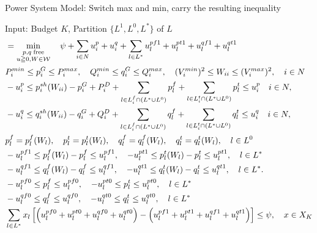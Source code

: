 \documentclass[xcolor=dvipsnames]{beamer}
\newcommand{\p}[1]{p^{#1}}
\newcommand{\q}[1]{q^{#1}}
\newcommand{\ii}{i}
\newcommand{\llll}{l}
\newcommand{\from}{f}
\newcommand{\tto}{t}
\newcommand{\WW}{W}
\newcommand{\WSet}{\mathcal{W}}
\newcommand{\Lines}{L}
\begin{document}
\begin{frame}{Power System Model: Switch max and min, carry the resulting inequality}
\begin{footnotesize}
Input: Budget $K$, Partition $\{ L^1,L^0,L^* \}$ of $L$
\begin{subequations}\label{MinmaxX}
\begin{align}
 &=\min_{\substack{p,q\;\text{free}\\ u \geqq 0,W\in \WSet}} \quad 
 \psi + \sum_{i \in N} u_i^p + u_i^q  + \sum_{l \in L^*} u_l^{pf1} + u_l^{pt1} + u_l^{qf1} + u_l^{qt1}\\
  & P_i^{min} \leq p_i^G \leq P_i^{max}, \quad Q_i^{min} \leq q_i^G \leq Q_i^{max}, \quad (V_i^{min})^2 \leq W_{ii} \leq (V_i^{max})^2,\quad i\in N \notag \\
  & -u_i^p \le p_i^{sh}(\WW_{ii}) - p^G_i + P^D_i 
	+ \sum_{\llll \in \Lines_\ii^{\from} \cap (L^* \cup L^0)  } p_{l}^{f}  
	+\sum_{\llll \in \Lines_\ii^{\tto} \cap (L^* \cup L^0) } p_{l}^{t} 
	\le u_i^p \quad i\in N, \notag\\ 
  & -u_i^q \le q_i^{sh}(\WW_{ii}) - q^G_i + Q^D_i 
	+ \sum_{\llll \in \Lines_\ii^{\from} \cap (L^* \cup L^0) } q_{l}^{f}
	+ \sum_{\llll \in \Lines_\ii^{\tto} \cap (L^* \cup L^0) } q_{l}^{t} 
	\le u_i^q \quad i\in N, \notag \\
& p_{l}^{f}=\p{\from}_{\llll}(\WW_\llll),\quad p_l^t=\p{\tto}_{\llll}(\WW_\llll),\quad q_l^f=\q{\from}_{\llll}(\WW_\llll),\quad q_l^t=\q{\tto}_{\llll}(\WW_\llll) , \quad \llll \in L^0 \notag \\
& -u_l^{pf1} \le \p{\from}_{\llll}(\WW_\llll) - p_{l}^{f} \le u_l^{pf1}, \quad
 -u_l^{pt1} \le \p{\tto}_{\llll}(\WW_\llll)  - p_{l}^{t} \le u_l^{pt1}, \quad \llll \in L^* \notag \\
& -u_l^{qf1} \le \q{\from}_{\llll}(\WW_\llll) - q_{l}^{f} \le u_l^{qf1}, \quad 
 -u_l^{qt1} \le \q{\tto}_{\llll}(\WW_\llll)  - q_{l}^{t} \le u_l^{qt1}, \quad \llll \in L^*. \notag \\
& -u_l^{pf0} \le p_l^f \le u_l^{pf0},\quad-u_l^{pt0} \le p_l^t \le u_l^{pt0}, \quad l \in L^* \notag\\ 
& -u_l^{qf0} \le q_l^f \le u_l^{qf0},\quad-u_l^{qt0} \le q_l^t \le u_l^{qt0}, \quad l \in L^* \notag \\ 
& \sum_{l \in L^*} x_l\left[ \left( u_l^{pf0} + u_l^{pt0} + u_l^{qf0} + u_l^{qt0} \right) -  \left( u_l^{pf1} + u_l^{pt1} + u_l^{qf1} + u_l^{qt1} \right) \right] \le \psi,\quad x \in X_K  \label{OverXK} \\
\end{align}
\end{subequations}
\end{footnotesize}
\end{frame}
\end{document}
